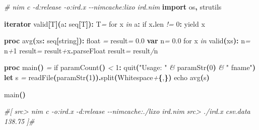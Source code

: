\documentclass[
  12pt,
]{book}
\newenvironment{Shaded}{}{}
\newcommand{\CharTok}[1]{\textcolor[rgb]{0.25,0.44,0.63}{#1}}
\newcommand{\CommentTok}[1]{\textcolor[rgb]{0.38,0.63,0.69}{\textit{#1}}}
\newcommand{\DataTypeTok}[1]{\textcolor[rgb]{0.56,0.13,0.00}{#1}}
\newcommand{\DecValTok}[1]{\textcolor[rgb]{0.25,0.63,0.44}{#1}}
\newcommand{\FloatTok}[1]{\textcolor[rgb]{0.25,0.63,0.44}{#1}}
\newcommand{\KeywordTok}[1]{\textcolor[rgb]{0.00,0.44,0.13}{\textbf{#1}}}
\newcommand{\NormalTok}[1]{#1}
\newcommand{\OtherTok}[1]{\textcolor[rgb]{0.00,0.44,0.13}{#1}}
\newcommand{\StringTok}[1]{\textcolor[rgb]{0.25,0.44,0.63}{#1}}
\begin{document}
\begin{Shaded}
\begin{Highlighting}[]
\CommentTok{\# nim c {-}d:release {-}o:ird.x {-}{-}nimcache:lixo ird.nim}
\KeywordTok{import}\NormalTok{ os}\KeywordTok{,}\NormalTok{ strutils}

\KeywordTok{iterator }\StringTok{valid}\KeywordTok{[}\DataTypeTok{T}\KeywordTok{](}\NormalTok{a}\KeywordTok{:} \DataTypeTok{seq}\KeywordTok{[}\DataTypeTok{T}\KeywordTok{]):} \DataTypeTok{T}\CommentTok{=}
  \DataTypeTok{for}\NormalTok{ x }\CommentTok{in}\NormalTok{ a}\KeywordTok{:}
     \DataTypeTok{if}\NormalTok{ x}\KeywordTok{.}\DataTypeTok{len} \CommentTok{!=} \DecValTok{0}\KeywordTok{:} \DataTypeTok{yield}\NormalTok{ x}

\KeywordTok{proc }\StringTok{avg}\KeywordTok{(}\NormalTok{xs}\KeywordTok{:} \DataTypeTok{seq}\KeywordTok{[}\DataTypeTok{string}\KeywordTok{]):} \DataTypeTok{float} \CommentTok{=}
  \OtherTok{result}\CommentTok{=} \DecValTok{0}\FloatTok{.}\DecValTok{0}
  \KeywordTok{var}\NormalTok{ n}\CommentTok{=} \DecValTok{0}\FloatTok{.}\DecValTok{0}
  \DataTypeTok{for}\NormalTok{ x }\CommentTok{in} \DataTypeTok{valid}\KeywordTok{(}\NormalTok{xs}\KeywordTok{):}
\NormalTok{    n}\CommentTok{=}\NormalTok{ n}\CommentTok{+}\DecValTok{1}
    \OtherTok{result}\CommentTok{=} \OtherTok{result}\CommentTok{+}\NormalTok{x}\KeywordTok{.}\DataTypeTok{parseFloat}
  \OtherTok{result}\CommentTok{=} \OtherTok{result}\CommentTok{/}\NormalTok{n}

\KeywordTok{proc }\StringTok{main}\KeywordTok{()} \CommentTok{=}
  \DataTypeTok{if} \DataTypeTok{paramCount}\KeywordTok{()} \CommentTok{\textless{}} \DecValTok{1}\KeywordTok{:} \DataTypeTok{quit}\KeywordTok{(}\StringTok{"Usage: "} \CommentTok{\&} \DataTypeTok{paramStr}\KeywordTok{(}\DecValTok{0}\KeywordTok{)} \CommentTok{\&} \StringTok{" fname"}\KeywordTok{)}
  \KeywordTok{let}
\NormalTok{    s }\CommentTok{=} \DataTypeTok{readFile}\KeywordTok{(}\DataTypeTok{paramStr}\KeywordTok{(}\DecValTok{1}\KeywordTok{)).}\DataTypeTok{split}\KeywordTok{(}\DataTypeTok{Whitespace}\CommentTok{+}\KeywordTok{\{}\CharTok{\textquotesingle{},\textquotesingle{}}\KeywordTok{\})}
  \DataTypeTok{echo} \DataTypeTok{avg}\KeywordTok{(}\NormalTok{s}\KeywordTok{)}

\DataTypeTok{main}\KeywordTok{()}

\CommentTok{\#[}
\CommentTok{src\textgreater{} nim c {-}o:ird.x {-}d:release {-}{-}nimcache:./lixo ird.nim}
\CommentTok{src\textgreater{} ./ird.x csv.data}
\CommentTok{138.75}
\CommentTok{]\#}
\end{Highlighting}
\end{Shaded}
\end{document}
